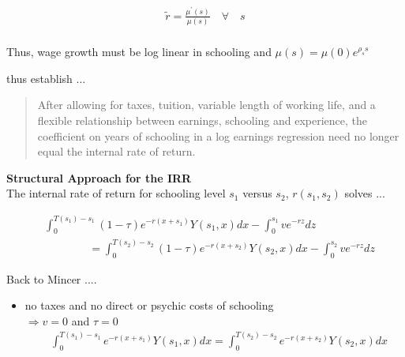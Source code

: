 \begin{frame}
\begin{align*}
\tilde{r} = \frac{\mu^\prime(s)}{\mu(s)}\quad\forall\quad s\\
\end{align*}

Thus, wage growth must be log linear in schooling and $\mu(s) = \mu(0)e^{\rho_s s}$
\end{frame}
\begin{frame}
\cite{Heckman.2006a} thus establish ... \vspace{0.5cm}

\begin{quote}
After allowing for taxes, tuition, variable length of working life, and a flexible relationship between earnings, schooling and experience, the coefficient on years of schooling in a log earnings regression need no longer equal the internal rate of return.
\end{quote}
\end{frame}
\begin{frame}\textbf{Structural Approach for the IRR}\vspace{0.3cm}\\

The internal rate of return for schooling level $s_1$ versus $s_2$, $r(s_1, s_2)$ solves ...

\begin{align*}
&\int_{0}^{T(s_1) - s_1} (1 - \tau)e^{-r(x + s_1)}Y(s_1, x) dx  - \int_{0}^{s_1} v e^{-r z} dz\\
&\qquad\qquad =  \int_{0}^{T(s_2) - s_2} (1 - \tau)e^{-r(x + s_2)}Y(s_2, x) dx - \int_{0}^{s_2} v e^{-r z} dz
\end{align*}

\end{frame}
\begin{frame}
Back to Mincer ....

\begin{itemize}
\item no taxes and no direct or psychic costs of schooling \\\vspace{0.3cm}
\hspace{0.3cm}$\Rightarrow v = 0$ and $\tau = 0$\vspace{0.3cm}
\begin{align*}
&\int_{0}^{T(s_1) - s_1} e^{-r(x + s_1)}Y(s_1, x) dx  = \int_{0}^{T(s_2) - s_2} e^{-r(x + s_2)}Y(s_2, x) dx
\end{align*}
\end{itemize}\end{frame}
